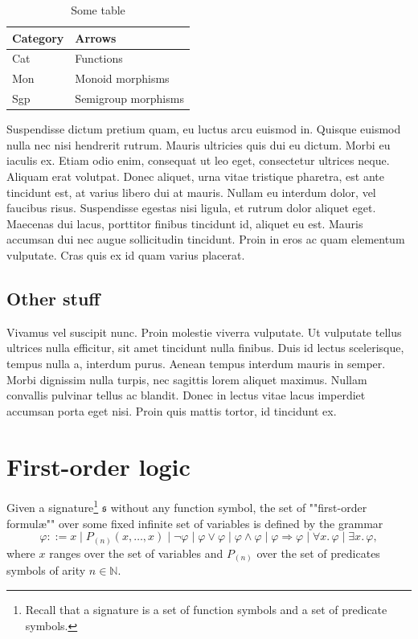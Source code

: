 \documentclass{fancy-article}
\begin{document}
\begin{table}
  \centering
  \begin{tabular}{ll}
    \toprule
    Category & Arrows \\
    \midrule
    \textsf{Cat} & Functions \\
    \textsf{Mon} & Monoid morphisms \\
    \textsf{Sgp} & Semigroup morphisms \\
    \bottomrule
  \end{tabular}
  \caption{Some table}
\end{table}
\AP Suspendisse dictum pretium quam, eu luctus arcu euismod in. Quisque euismod nulla nec nisi hendrerit rutrum. Mauris ultricies quis dui eu dictum. Morbi eu iaculis ex. Etiam odio enim, consequat ut leo eget, consectetur ultrices neque. Aliquam erat volutpat. Donec aliquet, urna vitae tristique pharetra, est ante tincidunt est, at varius libero dui at mauris. Nullam eu interdum dolor, vel faucibus risus. Suspendisse egestas nisi ligula, et rutrum dolor aliquet eget. Maecenas dui lacus, porttitor finibus tincidunt id, aliquet eu est. Mauris accumsan dui nec augue sollicitudin tincidunt. Proin in eros ac quam elementum vulputate. Cras quis ex id quam varius placerat.

\subsection{Other stuff}

\AP Vivamus vel suscipit nunc. Proin molestie viverra vulputate. Ut vulputate tellus ultrices nulla efficitur, sit amet tincidunt nulla finibus. Duis id lectus scelerisque, tempus nulla a, interdum purus. Aenean tempus interdum mauris in semper. Morbi dignissim nulla turpis, nec sagittis lorem aliquet maximus. Nullam convallis pulvinar tellus ac blandit. Donec in lectus vitae lacus imperdiet accumsan porta eget nisi. Proin quis mattis tortor, id tincidunt ex.


\section{First-order logic}


\AP Given a signature\footnote{Recall that a signature is a set of function 
symbols and a set of predicate symbols.}
$\mathfrak{s}$ without any function symbol,
the set of ""first-order formul\ae{}"" over some fixed infinite set of
variables is defined by the grammar
\[
  \varphi ::=
  x \mid P_{(n)}(x, \hdots, x) \mid \neg \varphi \mid \varphi \lor \varphi \mid \varphi \land \varphi
  \mid \varphi \Rightarrow \varphi \mid \forall x.\, \varphi \mid \exists x.\,
  \varphi,
\]
where $x$ ranges over the set of variables and $P_{(n)}$ over the
set of predicates symbols of arity $n\in \mathbb{N}$.
\end{document}

